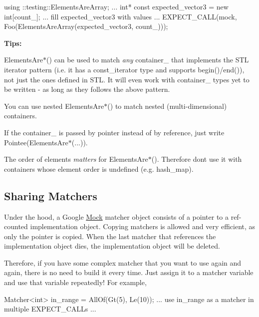 \begin{DoxyCode}
using ::testing::ElementsAreArray;
...
  \textcolor{keywordtype}{int}* \textcolor{keyword}{const} expected\_vector3 = \textcolor{keyword}{new} \textcolor{keywordtype}{int}[count_];
  ... fill expected\_vector3 with values ...
  EXPECT\_CALL(mock, Foo(ElementsAreArray(expected\_vector3, count_)));
\end{DoxyCode}


{\bfseries Tips\+:}


\begin{DoxyItemize}
\item {\ttfamily Elements\+Are$\ast$()} can be used to match {\itshape any} container_ that implements the S\+TL iterator pattern (i.\+e. it has a {\ttfamily const\+\_\+iterator} type and supports {\ttfamily begin()/end()}), not just the ones defined in S\+TL. It will even work with container_ types yet to be written -\/ as long as they follows the above pattern.
\item You can use nested {\ttfamily Elements\+Are$\ast$()} to match nested (multi-\/dimensional) containers.
\item If the container_ is passed by pointer instead of by reference, just write {\ttfamily Pointee(Elements\+Are$\ast$(...))}.
\item The order of elements {\itshape matters} for {\ttfamily Elements\+Are$\ast$()}. Therefore don\textquotesingle{}t use it with containers whose element order is undefined (e.\+g. {\ttfamily hash\+\_\+map}).
\end{DoxyItemize}

\subsection*{Sharing Matchers}

Under the hood, a Google \hyperlink{classMock}{Mock} matcher object consists of a pointer to a ref-\/counted implementation object. Copying matchers is allowed and very efficient, as only the pointer is copied. When the last matcher that references the implementation object dies, the implementation object will be deleted.

Therefore, if you have some complex matcher that you want to use again and again, there is no need to build it every time. Just assign it to a matcher variable and use that variable repeatedly! For example,


\begin{DoxyCode}
Matcher<int> in\_range = AllOf(Gt(5), Le(10));
... use in\_range as a matcher in multiple EXPECT\_CALLs ...
\end{DoxyCode}


